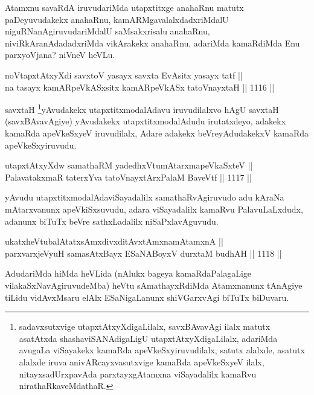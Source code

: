 \begin{artha}
Atamxnu savaRdA iruvudariMda utapxtitxge anahaRnu matutx paDeyuvudakekx anahaRnu, kamARMgavalalxdadxriMdalU niguRNanAgiruvudariMdalU saMsakxrisalu anahaRnu, niviRkAranAdadadxriMda vikArakekx anahaRnu, adariMda kamaRdiMda Enu parxyoVjana? niVneV heVLu.
\end{artha}

\begin{shl}
noVtapxtAtxyXdi savxtoV yasayx savxta EvAsitx yasayx tatf || \\
na tasayx kamARpeVkASx\s sitx kamARpeVkASx tatoV\s nayxtaH \hfill || 1116 ||  
\end{shl}

\begin{artha}
savxtaH \footnote{sadavxsutxvige utapxtAtxyXdigaLilalx, savxBAvavAgi ilalx matutx asatAtxda shashaviSANAdigaLigU utapxtAtxyXdigaLilalx, adariMda avugaLa viSayakekx kamaRda apeVkeSxyiruvudilalx, satutx alalxde, asatutx alalxde iruva anivARcayxvasutxvige kamaRda apeVkeSxyeV ilalx, nitayxsadUrxpavAda parxtayxgAtamxna viSayadalilx kamaRvu nirathaRkaveMdathaR.}yAvudakekx utapxtitxmodalAdavu iruvudilalxvo hAgU savxtaH (savxBAvavAgiye) yAvudakekx utapxtitxmodalAdudu irutatxdeyo, adakekx kamaRda apeVkeSxyeV iruvudilalx, Adare adakekx beVreyAdudakekxV kamaRda apeVkeSxyiruvudu.
\end{artha}


\begin{shl}
utapxtAtxyXdw samathaRM yadedhxVtumAtarxmapeVkaSxteV ||  \\
PalavatakxmaR taterxYva tatoV\s nayxtArxPalaM BaveVtf \hfill || 1117 ||  
\end{shl}

\begin{artha}
yAvudu utapxtitxmodalAdaviSayadalilx samathaRvAgiruvudo adu kAraNa mAtarxvanunx 
apeVkiSxsuvudu, adara viSayadalilx kamaRvu PalavuLaLxdudx, adanunx biTuTx beVre 
sathxLadalilx niSaPxlavAguvudu.
\end{artha}

\begin{shl}
ukatxheVtubalAtatxsAmxdivxditAvx\s \s tAmxnamAtamxnA ||  \\
parxvarxjeVyuH samasAtxBayx ESaNABoyxV durxtaM budhAH \hfill || 1118 ||  
\end{shl}

\begin{artha}
AdudariMda hiMda heVLida (nAlukx bageya kamaRdaPalagaLige vilakaSxNavAgiruvudeMba) heVtu sAmathayxRdiMda Atamxnanunx tAnAgiye tiLidu vidAvxMsaru elAlx ESaNigaLanunx shiVGarxvAgi biTuTx biDuvaru.
\end{artha}

